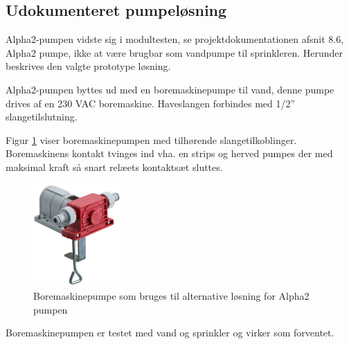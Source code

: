 
\subsection{Udokumenteret pumpeløsning}
\label{sec:Udokumenteretpumpeloesning}

Alpha2-pumpen vidste sig i modultesten, se projektdokumentationen afsnit 8.6, Alpha2 pumpe, ikke at være brugbar som vandpumpe til sprinkleren. Herunder beskrives den valgte prototype løsning.

Alpha2-pumpen byttes ud med en boremaskinepumpe til vand, denne pumpe drives af en 230 VAC boremaskine. Haveslangen forbindes med 1/2'' slangetilslutning. 

Figur \ref{fig:boremaskinepumpe} viser boremaskinepumpen med tilhørende slangetilkoblinger. Boremaskinens kontakt tvinges ind vha. en strips og herved pumpes der med maksimal kraft så snart relæets kontaktsæt sluttes. 

\begin{figure}[h]
  \centering
    \includegraphics[width=0.3\textwidth]{Billeder/boremaskinepumpe}
    \caption{Boremaskinepumpe som bruges til alternative løsning for Alpha2 pumpen}
    \label{fig:boremaskinepumpe}
\end{figure}

Boremaskinepumpen er testet med vand og sprinkler og virker som forventet. 